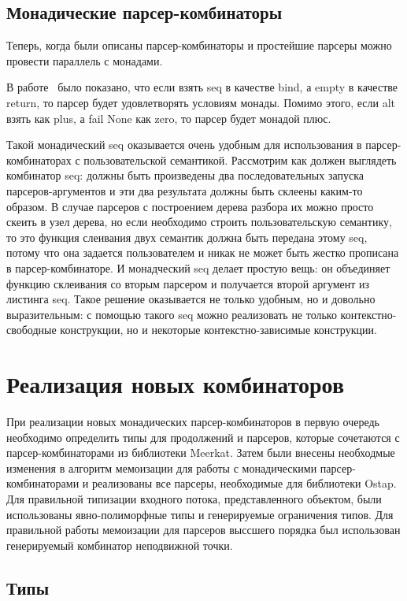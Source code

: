 \documentclass[conference]{IEEEtran}
\begin{document}
\subsection{Монадические парсер-комбинаторы}
Теперь, когда были описаны парсер-комбинаторы и простейшие парсеры можно провести параллель с монадами.

В работе~\cite{wadler} было показано, что если взять seq в качестве bind, а empty в качестве return, то парсер будет удовлетворять условиям монады. Помимо этого, если alt взять как plus, а fail None как zero, то парсер будет монадой плюс.

Такой монадический seq оказывается очень удобным для использования в парсер-комбинаторах с пользовательской семантикой. Рассмотрим как должен выглядеть комбинатор seq: должны быть произведены два последовательных запуска парсеров-аргументов и эти два результата должны быть склеены каким-то образом. В случае парсеров с построением дерева разбора их можно просто скеить в узел дерева, но если необходимо строить пользовательскую семантику, то это функция слеивания двух семантик должна быть передана этому seq, потому что она задается пользователем и никак не может быть жестко прописана в парсер-комбинаторе. И монадческий seq делает простую вещь: он объединяет функцию склеивания со вторым парсером и получается второй аргумент из листинга seq. Такое решение оказывается не только удобным, но и довольно выразительным: с помощью такого seq можно реализовать не только контекстно-свободные конструкции, но и некоторые контекстно-зависимые конструкции.

\section{Реализация новых комбинаторов}

При реализации новых монадических парсер-комбинаторов в первую очередь необходимо определить типы для продолжений и парсеров, которые сочетаются с парсер-комбинаторами из библиотеки Meerkat.
Затем были внесены необходмые изменения в алгоритм мемоизации для работы с монадическими парсер-комбинаторами и реализованы все парсеры, необходимые для библиотеки Ostap.
Для правильной типизации входного потока, представленного объектом, были использованы явно-полиморфные типы и генерируемые ограничения типов.
Для правильной работы мемоизации для парсеров выссшего порядка был использован генерируемый комбинатор неподвижной точки.

\subsection{Типы}
\end{document}
